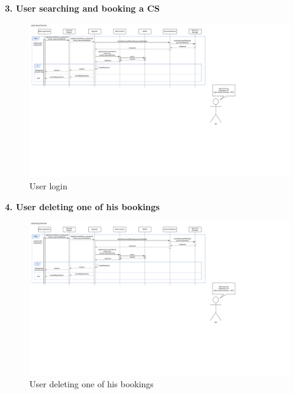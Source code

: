 \documentclass[11pt]{article}
\begin{document}
\begin{description}
    \newpage
    
    \item \textbf{3. User searching and booking a CS}
    \begin{figure}[!ht]
        \centering
        \includegraphics[page={3}, trim=0cm 5cm 0cm 1cmm, width=\linewidth, clip]{RuntimeDiagrams.pdf}
        \caption{User login}
    \end{figure}
    
    \item \textbf{4. User deleting one of his bookings}
    \begin{figure}[!ht]
        \centering
        \includegraphics[page={4}, trim=0cm 10cm 21cm 1cmm, width=0.95\linewidth, clip]{RuntimeDiagrams.pdf}
        \caption{User deleting one of his bookings}
    \end{figure}
    
    \newpage
    

\end{description}
\end{document}
